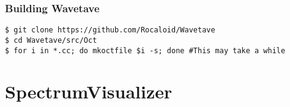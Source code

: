         \subsubsection{Building Wavetave}\indent
        
        \lstset{language = bash, tabsize = 4}
        
        \begin{lstlisting}
$ git clone https://github.com/Rocaloid/Wavetave
$ cd Wavetave/src/Oct
$ for i in *.cc; do mkoctfile $i -s; done #This may take a while
        \end{lstlisting}

\section{SpectrumVisualizer}
        
        


